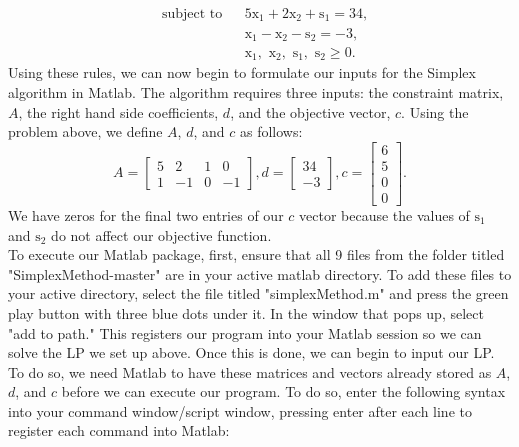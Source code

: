 \documentclass[12pt]{article}
\begin{document}
\begin{equation*}
	\begin{aligned}
	& \text{subject to}
	& & 5\text{x}_{1} + 2\text{x}_{2} + \text{s}_{1} = 34, \\
	&&& \text{x}_{1} - \text{x}_{2} - \text{s}_{2} = -3, \\
	&&& \text{x}_{1}, \text{ x}_{2}, \text{ s}_{1}, \text{ s}_{2} \geq 0.
	\end{aligned}
\end{equation*}
\quad Using these rules, we can now begin to formulate our inputs for the Simplex algorithm in Matlab. The algorithm requires three inputs: the constraint matrix, $A$, the right hand side coefficients, $d$, and the objective vector, $c$. Using the problem above, we define $A$, $d$, and $c$ as follows:
\begin{equation*}
	A = 
	\begin{bmatrix}
	5 & 2 & 1 & 0 \\
	1 & -1 & 0 & -1
	\end{bmatrix},
	d = 
	\begin{bmatrix}
	34 \\
	-3
	\end{bmatrix},
	c = 
	\begin{bmatrix}
	6 \\
	5 \\
	0 \\
	0
	\end{bmatrix}.
\end{equation*}
\quad We have zeros for the final two entries of our $c$ vector because the values of $\text{s}_{1}$ and $\text{s}_{2}$ do not affect our objective function. \\
\quad To execute our Matlab package, first, ensure that all 9 files from the folder titled "SimplexMethod-master" are in your active matlab directory. To add these files to your active directory, select the file titled "simplexMethod.m" and press the green play button with three blue dots under it. In the window that pops up, select "add to path." This registers our program into your Matlab session so we can solve the LP we set up above. Once this is done, we can begin to input our LP. To do so, we need Matlab to have these matrices and vectors already stored as $A$, $d$, and $c$ before we can execute our program. To do so, enter the following syntax into your command window/script window, pressing enter after each line to register each command into Matlab: \\
\\
\end{document}

